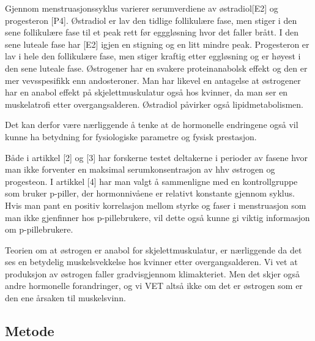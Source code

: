 \documentclass[
  letterpaper,
  DIV=11,
  numbers=noendperiod]{scrreprt}
\begin{document}
Gjennom menstruasjonssyklus varierer serumverdiene av østradiol{[}E2{]}
og progesteron {[}P4{]}. Østradiol er lav den tidlige follikulære fase,
men stiger i den sene follikulære fase til et peak rett før egggløsning
hvor det faller brått. I den sene luteale fase har {[}E2{]} igjen en
stigning og en litt mindre peak. Progesteron er lav i hele den
follikulære fase, men stiger kraftig etter eggløsning og er høyest i den
sene luteale fase. Østrogener har en svakere proteinanabolsk effekt og
den er mer vevsspesifikk enn andosteroner. Man har likevel en antagelse
at østrogener har en anabol effekt på skjelettmuskulatur også hos
kvinner, da man ser en muskelatrofi etter overgangsalderen. Østradiol
påvirker også lipidmetabolismen.

Det kan derfor være nærliggende å tenke at de hormonelle endringene også
vil kunne ha betydning for fysiologiske parametre og fysisk prestasjon.

Både i artikkel {[}2{]} og {[}3{]} har forskerne testet deltakerne i
perioder av fasene hvor man ikke forventer en maksimal
serumkonsentrasjon av hhv østrogen og progesteon. I artikkel {[}4{]} har
man valgt å sammenligne med en kontrollgruppe som bruker p-piller, der
hormonnivåene er relativt konstante gjennom syklus. Hvis man pant en
positiv korrelasjon mellom styrke og faser i menstruasjon som man ikke
gjenfinner hos p-pillebrukere, vil dette også kunne gi viktig
informasjon om p-pillebrukere.

Teorien om at østrogen er anabol for skjelettmuskulatur, er nærliggende
da det ses en betydelig muskelsvekkelse hos kvinner etter
overgangsalderen. Vi vet at produksjon av østrogen faller gradvisgjennom
klimakteriet. Men det skjer også andre hormonelle forandringer, og vi
VET altså ikke om det er østrogen som er den ene årsaken til
muskelsvinn.

\hypertarget{metode-1}{%
\subsection{Metode}\label{metode-1}}
\end{document}
